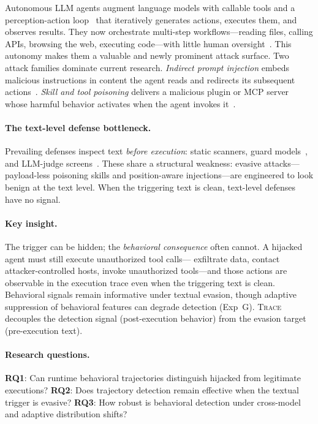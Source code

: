 \documentclass[conference]{IEEEtran}
\begin{document}
Autonomous LLM agents augment language models with callable tools and
a perception-action loop~\cite{schick2023toolformer,yao2023react,
guo2024survey} that iteratively generates actions, executes them, and
observes results.  They now orchestrate multi-step workflows---reading
files, calling APIs, browsing the web, executing code---with little
human oversight~\cite{wang2024survey}.  This autonomy
makes them a valuable and newly prominent attack surface.  Two attack
families dominate current research.  \emph{Indirect prompt injection}
embeds malicious instructions in content the agent reads and redirects
its subsequent actions~\cite{greshake2023not,perez2022ignore,
zhan2024injectagent}.  \emph{Skill and tool poisoning} delivers a
malicious plugin or MCP server whose harmful behavior activates when
the agent invokes it~\cite{shi2024badagent,yang2024watch}.

\paragraph{The text-level defense bottleneck.}
Prevailing defenses inspect text \emph{before execution}: static
scanners, guard models~\cite{inan2023llama}, and LLM-judge
screens~\cite{yi2023benchmarking}.  These share a structural weakness:
evasive attacks---payload-less poisoning skills and position-aware
injections---are engineered to look benign at the text level.
When the triggering text is clean, text-level defenses have no signal.

\paragraph{Key insight.}
The trigger can be hidden; the \emph{behavioral consequence} often
cannot.  A hijacked agent must still execute unauthorized tool calls---
exfiltrate data, contact attacker-controlled hosts, invoke unauthorized
tools---and those actions are observable in the execution trace even
when the triggering text is clean.  Behavioral signals remain
informative under textual evasion, though adaptive suppression of
behavioral features can degrade detection (Exp~G).
\textsc{Trace} decouples the detection signal (post-execution behavior)
from the evasion target (pre-execution text).

\paragraph{Research questions.}
\textbf{RQ1}: Can runtime behavioral trajectories distinguish hijacked
from legitimate executions?
\textbf{RQ2}: Does trajectory detection remain effective when the
textual trigger is evasive?
\textbf{RQ3}: How robust is behavioral detection under cross-model
and adaptive distribution shifts?
\end{document}
